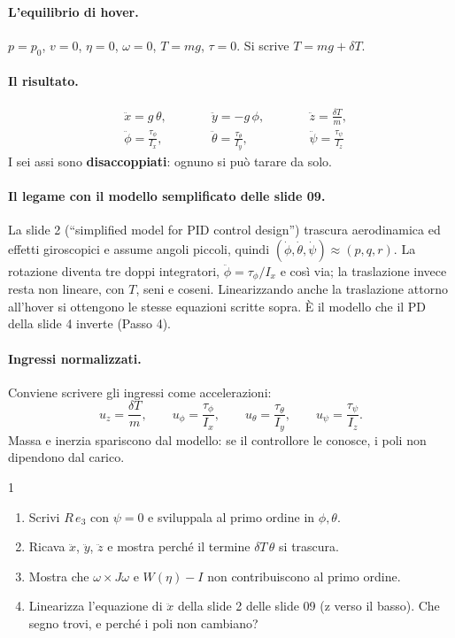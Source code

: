 \documentclass[11pt,a4paper]{article}
\begin{document}
\paragraph{L'equilibrio di hover.} $p = p_0$, $v = 0$, $\eta = 0$, $\omega = 0$, $T = mg$, $\tau = 0$. Si scrive $T = mg + \delta T$.

\paragraph{Il risultato.}
\[
\boxed{\begin{aligned}
&\ddot x = g\,\theta, &\qquad &\ddot y = -g\,\phi, &\qquad &\ddot z = \frac{\delta T}{m}, \\
&\ddot\phi = \frac{\tau_\phi}{I_x}, & &\ddot\theta = \frac{\tau_\theta}{I_y}, & &\ddot\psi = \frac{\tau_\psi}{I_z}
\end{aligned}}
\]
I sei assi sono \textbf{disaccoppiati}: ognuno si può tarare da solo.

\paragraph{Il legame con il modello semplificato delle slide 09.} La slide 2 (``simplified model for PID control design'') trascura aerodinamica ed effetti giroscopici e assume angoli piccoli, quindi $(\dot\phi, \dot\theta, \dot\psi) \approx (p, q, r)$. La rotazione diventa tre doppi integratori, $\ddot\phi = \tau_\phi/I_x$ e così via; la traslazione invece resta non lineare, con $T$, seni e coseni. Linearizzando anche la traslazione attorno all'hover si ottengono le stesse equazioni scritte sopra. È il modello che il PD della slide 4 inverte (Passo 4).

\paragraph{Ingressi normalizzati.} Conviene scrivere gli ingressi come accelerazioni:
\[
u_z = \frac{\delta T}{m}, \qquad u_\phi = \frac{\tau_\phi}{I_x}, \qquad u_\theta = \frac{\tau_\theta}{I_y}, \qquad u_\psi = \frac{\tau_\psi}{I_z}.
\]
Massa e inerzia spariscono dal modello: se il controllore le conosce, i poli non dipendono dal carico.

\begin{esercizio}{1}
\begin{enumerate}[label=(\alph*)]
  \item Scrivi $R\,e_3$ con $\psi = 0$ e sviluppala al primo ordine in $\phi, \theta$.
  \item Ricava $\ddot x$, $\ddot y$, $\ddot z$ e mostra perché il termine $\delta T\,\theta$ si trascura.
  \item Mostra che $\omega \times J\omega$ e $W(\eta) - I$ non contribuiscono al primo ordine.
  \item Linearizza l'equazione di $\ddot x$ della slide 2 delle slide 09 (z verso il basso). Che segno trovi, e perché i poli non cambiano?
\end{enumerate}
\end{esercizio}
\end{document}

